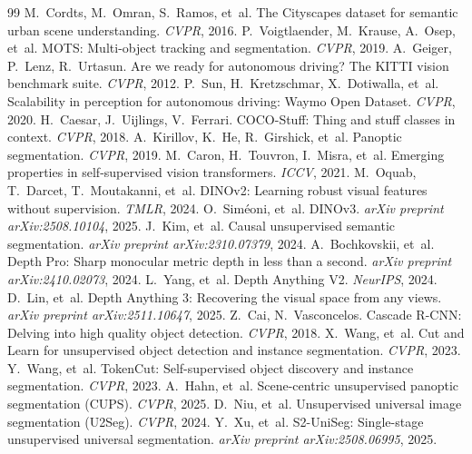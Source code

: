 \documentclass[10pt,twocolumn,letterpaper]{article}
\begin{document}
\begin{thebibliography}{99}
 M.~Cordts, M.~Omran, S.~Ramos, et~al. The Cityscapes dataset for semantic urban scene understanding. \emph{CVPR}, 2016.
 P.~Voigtlaender, M.~Krause, A.~Osep, et~al. MOTS: Multi-object tracking and segmentation. \emph{CVPR}, 2019.
 A.~Geiger, P.~Lenz, R.~Urtasun. Are we ready for autonomous driving? The KITTI vision benchmark suite. \emph{CVPR}, 2012.
 P.~Sun, H.~Kretzschmar, X.~Dotiwalla, et~al. Scalability in perception for autonomous driving: Waymo Open Dataset. \emph{CVPR}, 2020.
 H.~Caesar, J.~Uijlings, V.~Ferrari. COCO-Stuff: Thing and stuff classes in context. \emph{CVPR}, 2018.
 A.~Kirillov, K.~He, R.~Girshick, et~al. Panoptic segmentation. \emph{CVPR}, 2019.
 M.~Caron, H.~Touvron, I.~Misra, et~al. Emerging properties in self-supervised vision transformers. \emph{ICCV}, 2021.
 M.~Oquab, T.~Darcet, T.~Moutakanni, et~al. DINOv2: Learning robust visual features without supervision. \emph{TMLR}, 2024.
 O.~Sim\'eoni, et~al. DINOv3. \emph{arXiv preprint arXiv:2508.10104}, 2025.
 J.~Kim, et~al. Causal unsupervised semantic segmentation. \emph{arXiv preprint arXiv:2310.07379}, 2024.
 A.~Bochkovskii, et~al. Depth Pro: Sharp monocular metric depth in less than a second. \emph{arXiv preprint arXiv:2410.02073}, 2024.
 L.~Yang, et~al. Depth Anything V2. \emph{NeurIPS}, 2024.
 D.~Lin, et~al. Depth Anything 3: Recovering the visual space from any views. \emph{arXiv preprint arXiv:2511.10647}, 2025.
 Z.~Cai, N.~Vasconcelos. Cascade R-CNN: Delving into high quality object detection. \emph{CVPR}, 2018.
 X.~Wang, et~al. Cut and Learn for unsupervised object detection and instance segmentation. \emph{CVPR}, 2023.
 Y.~Wang, et~al. TokenCut: Self-supervised object discovery and instance segmentation. \emph{CVPR}, 2023.
 A.~Hahn, et~al. Scene-centric unsupervised panoptic segmentation (CUPS). \emph{CVPR}, 2025.
 D.~Niu, et~al. Unsupervised universal image segmentation (U2Seg). \emph{CVPR}, 2024.
 Y.~Xu, et~al. S2-UniSeg: Single-stage unsupervised universal segmentation. \emph{arXiv preprint arXiv:2508.06995}, 2025.

\end{thebibliography}
\end{document}
